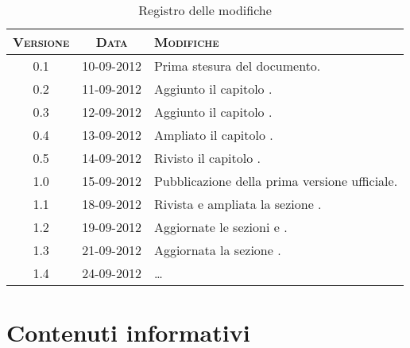 \documentclass[10pt,a4paper,headinclude,footinclude,hidelinks]{scrreprt} %
\begin{document}
    \title{\rmfamily\normalfont{}}
    \author{}
    \date{\today}
    
    \maketitle
    
    \begin{abstract}
        \noindent Il documento presenta i risultati delle fasi di analisi e di progettazione dei nuovi criteri di classificazione.
    \end{abstract}
    
	\begin{table}[ht]
	\centering
	\begin{tabular}{|c|c|l|}
	\hline
	\textsc{Versione} & \textsc{Data} & \textsc{Modifiche} \\ \hline
	0.1 & 10-09-2012 & Prima stesura del documento. \\ \hline
	0.2 & 11-09-2012 & Aggiunto il capitolo \nameref{ch:stage:contenuti}. \\ \hline
	0.3 & 12-09-2012 & Aggiunto il capitolo \nameref{ch:stage:requisiti}. \\ \hline
	0.4 & 13-09-2012 & Ampliato il capitolo \nameref{ch:stage:requisiti}. \\ \hline
	0.5 & 14-09-2012 & Rivisto il capitolo \nameref{ch:stage:requisiti}. \\ \hline
	1.0 & 15-09-2012 & Pubblicazione della prima versione ufficiale. \\ \hline
	1.1 & 18-09-2012 & Rivista e ampliata la sezione \nameref{ch:stage:requisiti}. \\ \hline
	1.2 & 19-09-2012 & Aggiornate le sezioni \textit{\nameref{sec:stage:requisiti:entità}} e \textit{\nameref{sec:stage:requisiti:etichette}}. \\ \hline
	1.3 & 21-09-2012 & Aggiornata la sezione \textit{\nameref{sec:stage:requisiti:contenuti}}. \\ \hline
	1.4 & 24-09-2012 & \ldots \\ \hline
	\end{tabular}
	\caption{Registro delle modifiche}
	\label{tab:stage:wp:workload}
	\end{table}

	\tableofcontents

	\chapter{Contenuti informativi}
	\label{ch:stage:contenuti}
\end{document}
